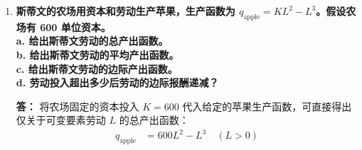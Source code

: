 \begin{enumerate}[label=\textbf{\arabic*.}, leftmargin=*]
		（2）将要素价格 $r = 64$、$w = 32$ 代入上述总成本函数中，化简得到关于产量 $q$ 的短期总成本函数：
		\[
		\begin{aligned}
			TC &= 10q + 32 \times 40 + \frac{q}{10} \left[ 64 \left(\frac{128}{64}\right)^{0.2} + 32 \left(\frac{64}{128}\right)^{0.8} \right] \approx 1280 + 19.184q
		\end{aligned}
		\]
		考察规模报酬性质，令投入要素按同比例 $\lambda$（$\lambda > 1$）增加：
		\[
		\begin{aligned}
			F(\lambda K, \lambda L) = 10(\lambda K)^{0.8}(\lambda L - 40)^{0.2} = \lambda \cdot 10K^{0.8}\left(L - \frac{40}{\lambda}\right)^{0.2} > \lambda F(K, L)
		\end{aligned}
		\]
		因为当 $\lambda > 1$ 时 $L - 40/\lambda > L - 40$，产出增加的比例严格大于要素增加的比例，故该技术呈现规模报酬递增。
		
		（3）当目标产量为 $q = 2000$ 时，代入第一问的条件要素需求函数中：
		\[
		\begin{aligned}
			L &= 40 + 200 \left(\frac{64}{128}\right)^{0.8} \approx 155 \text{ (小时)} \\
			K &= \frac{2000}{10(64/128)^{0.2}} \approx 230 \text{ (机器小时)}
		\end{aligned}
		\]
		按每周 40 小时折算，需雇佣劳动力约为 $155 / 40 = 3.875$ 人，需租用机器约为 $230 / 40 = 5.75$ 台。此产出水平下的边际成本与平均成本分别为：
		\[
		\begin{aligned}
			MC &= \frac{\mathrm{d}TC}{\mathrm{d}q} = 19.184 \text{ (美元/件)} \\
			AC &= \frac{TC}{q} = \frac{1280 + 19.184 \times 2000}{2000} \approx 19.824 \text{ (美元/件)}
		\end{aligned}
		\]
		\newpage
		\item \textbf{斯蒂文的农场用资本和劳动生产苹果，生产函数为 $q_{\text{apple}} = KL^2 - L^3$。假设农场有 600 单位资本。\\
			a. 给出斯蒂文劳动的总产出函数。\\
			b. 给出斯蒂文劳动的平均产出函数。\\
			c. 给出斯蒂文劳动的边际产出函数。\\
			d. 劳动投入超出多少后劳动的边际报酬递减？}
		
		\textbf{答：}
		将农场固定的资本投入 $K=600$ 代入给定的苹果生产函数，可直接得出仅关于可变要素劳动 $L$ 的总产出函数：
		\[
		\begin{aligned}
			q_{\text{apple}} &= 600L^2 - L^3 \quad (L > 0)
		\end{aligned}
		\]
		

\end{enumerate}
